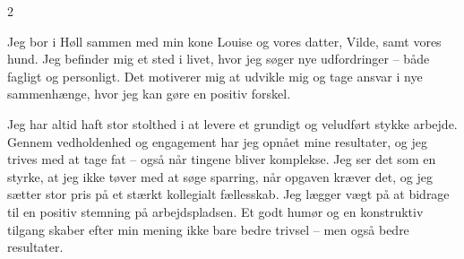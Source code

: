 \documentclass[10pt,a4paper,normalphoto]{altacv}
\begin{document}
\begin{paracol}{2}


Jeg bor i Høll sammen med min kone Louise og vores datter, Vilde, samt vores hund. Jeg befinder mig et sted i livet, hvor jeg søger nye udfordringer – både fagligt og personligt. Det motiverer mig at udvikle mig og tage ansvar i nye sammenhænge, hvor jeg kan gøre en positiv forskel.

Jeg har altid haft stor stolthed i at levere et grundigt og veludført stykke arbejde. Gennem vedholdenhed og engagement har jeg opnået mine resultater, og jeg trives med at tage fat – også når tingene bliver komplekse. Jeg ser det som en styrke, at jeg ikke tøver med at søge sparring, når opgaven kræver det, og jeg sætter stor pris på et stærkt kollegialt fællesskab. Jeg lægger vægt på at bidrage til en positiv stemning på arbejdspladsen. Et godt humør og en konstruktiv tilgang skaber efter min mening ikke bare bedre trivsel – men også bedre resultater.




\end{paracol}
\end{document}
